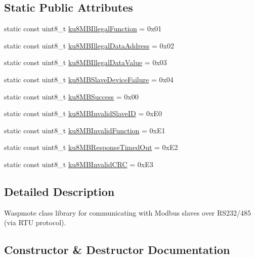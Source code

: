 \subsection*{Static Public Attributes}
\begin{DoxyCompactItemize}
\item 
static const uint8\+\_\+t \hyperlink{class_modbus_master485_a7057a8d96e13d4aef825efb4598f08c1}{ku8\+M\+B\+Illegal\+Function} = 0x01
\item 
static const uint8\+\_\+t \hyperlink{class_modbus_master485_ab8e16e9a1819d2fb46f3a3e03021da02}{ku8\+M\+B\+Illegal\+Data\+Address} = 0x02
\item 
static const uint8\+\_\+t \hyperlink{class_modbus_master485_a393b0b7ea005a15cb3d88bad75bdcdf2}{ku8\+M\+B\+Illegal\+Data\+Value} = 0x03
\item 
static const uint8\+\_\+t \hyperlink{class_modbus_master485_aca7c2882e4cfd65b9eac00ba1f5d1f23}{ku8\+M\+B\+Slave\+Device\+Failure} = 0x04
\item 
static const uint8\+\_\+t \hyperlink{class_modbus_master485_a4cf669f82295bd503124df2420d6269a}{ku8\+M\+B\+Success} = 0x00
\item 
static const uint8\+\_\+t \hyperlink{class_modbus_master485_a8c6645d913b0149ebb97ecba35d0a99d}{ku8\+M\+B\+Invalid\+Slave\+ID} = 0x\+E0
\item 
static const uint8\+\_\+t \hyperlink{class_modbus_master485_a0cef4e3625e700c5893a6f2566740d20}{ku8\+M\+B\+Invalid\+Function} = 0x\+E1
\item 
static const uint8\+\_\+t \hyperlink{class_modbus_master485_a16a3978380bf0be30685dc082452a13f}{ku8\+M\+B\+Response\+Timed\+Out} = 0x\+E2
\item 
static const uint8\+\_\+t \hyperlink{class_modbus_master485_a4b903c24f9893f0f3cd045e1d0b6cdeb}{ku8\+M\+B\+Invalid\+C\+RC} = 0x\+E3
\end{DoxyCompactItemize}


\subsection{Detailed Description}
Waspmote class library for communicating with Modbus slaves over R\+S232/485 (via R\+TU protocol). 

\subsection{Constructor \& Destructor Documentation}
